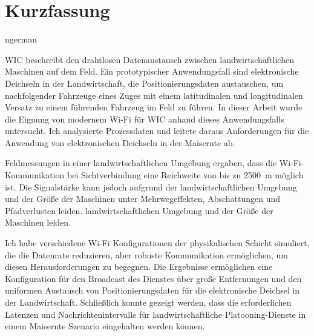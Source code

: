 \chapter*{Kurzfassung}
\begin{otherlanguage*}{ngerman}


\acf{WIC} beschreibt den drahtlosen Datenaustausch zwischen landwirtschaftlichen Maschinen auf dem Feld.
Ein prototypischer Anwendungsfall sind elektronische Deichseln in der Landwirtschaft, die Positionierungsdaten austauschen, um nachfolgender
Fahrzeuge eines Zuges mit einem latitudinalen und longitudinalen Versatz zu einem führenden Fahrzeug im Feld zu führen.
In dieser Arbeit wurde die Eignung von modernem Wi-Fi für \ac{WIC} anhand dieses Anwendungsfalls untersucht.
Ich analysierte Prozessdaten und leitete daraus Anforderungen für die Anwendung von elektronischen Deichseln in der Maisernte ab.

Feldmessungen in einer landwirtschaftlichen Umgebung ergaben, dass die Wi-Fi-Kommunikation bei Sichtverbindung eine Reichweite von bis zu \SI{2500}{\metre}
möglich ist.
Die Signalstärke kann jedoch aufgrund der landwirtschaftlichen Umgebung und der Größe der Maschinen unter Mehrwegeffekten, Abschattungen und Pfadverlusten leiden.
landwirtschaftlichen Umgebung und der Größe der Maschinen leiden.

Ich habe verschiedene Wi-Fi Konfigurationen der physikalischen Schicht simuliert, die die Datenrate reduzieren, aber
robuste Kommunikation ermöglichen, um diesen Herausforderungen zu begegnen.
Die Ergebnisse ermöglichen eine Konfiguration für den Broadcast des Dienstes über große Entfernungen und den uniformen Austausch von
Positionierungsdaten für die elektronische Deichsel in der Landwirtschaft.
Schließlich konnte gezeigt werden, dass die erforderlichen Latenzen und Nachrichtenintervalle für landwirtschaftliche Platooning-Dienste in einem Maisernte
Szenario eingehalten werden können.

\end{otherlanguage*}
\acresetall



\cleardoublepage